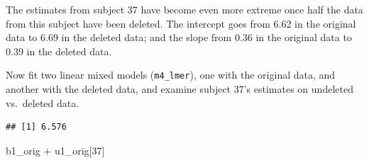\documentclass[
  12pt,
]{krantz}
\newenvironment{Shaded}{\begin{snugshade}}{\end{snugshade}}
\newcommand{\AttributeTok}[1]{\textcolor[rgb]{0.77,0.63,0.00}{#1}}
\newcommand{\DecValTok}[1]{\textcolor[rgb]{0.00,0.00,0.81}{#1}}
\newcommand{\DocumentationTok}[1]{\textcolor[rgb]{0.56,0.35,0.01}{\textbf{\textit{#1}}}}
\newcommand{\FunctionTok}[1]{\textcolor[rgb]{0.00,0.00,0.00}{#1}}
\newcommand{\NormalTok}[1]{#1}
\newcommand{\OtherTok}[1]{\textcolor[rgb]{0.56,0.35,0.01}{#1}}
\newcommand{\SpecialCharTok}[1]{\textcolor[rgb]{0.00,0.00,0.00}{#1}}
\newcommand{\StringTok}[1]{\textcolor[rgb]{0.31,0.60,0.02}{#1}}
\theoremstyle{definition}
\theoremstyle{definition}
\theoremstyle{definition}
\theoremstyle{definition}
\theoremstyle{remark}
\begin{document}
The estimates from subject 37 have become even more extreme once half the data from this subject have been deleted. The intercept goes from 6.62 in the original data to
6.69 in the deleted data; and the slope from 0.36 in the original data to
0.39 in the deleted data.

Now fit two linear mixed models (\texttt{m4\_lmer}), one with the original data, and another with the deleted data, and examine subject 37's estimates on undeleted vs.~deleted data.

\begin{Shaded}
\end{Shaded}

\begin{verbatim}
## [1] 6.576
\end{verbatim}

\begin{Shaded}
\begin{Highlighting}[]
\NormalTok{b1\_orig }\SpecialCharTok{+}\NormalTok{ u1\_orig[}\DecValTok{37}\NormalTok{]}
\end{Highlighting}
\end{Shaded}
\end{document}
